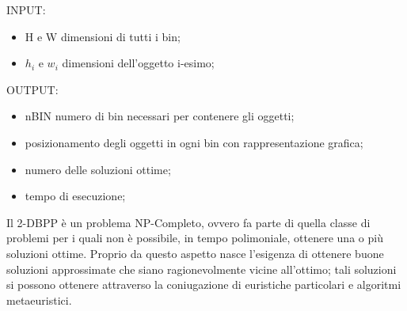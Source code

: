 INPUT:
\begin{itemize}
  \item H e W dimensioni di tutti i bin;
  \item $h_{i}$ e $w_{i}$ dimensioni dell’oggetto i-esimo;
\end{itemize}

OUTPUT:
\begin{itemize}
 \item nBIN numero di bin necessari per contenere gli oggetti;
 \item posizionamento degli oggetti in ogni bin con rappresentazione grafica;
 \item numero delle soluzioni ottime;
 \item tempo di esecuzione;
\end{itemize}

Il 2-DBPP è un problema NP-Completo, ovvero fa parte di quella classe di
problemi per i quali non è possibile, in tempo polimoniale, ottenere una o più
soluzioni ottime.
Proprio da questo aspetto nasce l'esigenza di ottenere buone soluzioni
approssimate che siano ragionevolmente vicine all'ottimo; tali soluzioni si
possono ottenere attraverso la coniugazione di euristiche particolari e
algoritmi metaeuristici. 